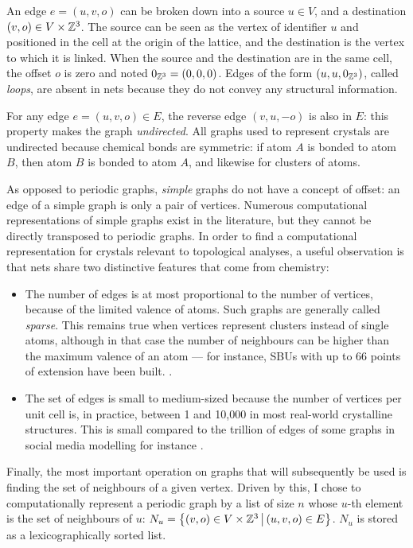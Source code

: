 \documentclass[main.tex]{subfiles}
\begin{document}
An edge $e = (u,v,o)$ can be broken down into a source $u\in V$, and a destination $(v,o)\in V\times\mathbb{Z}^3$. The source can be seen as the vertex of identifier $u$ and positioned in the cell at the origin of the lattice, and the destination is the vertex to which it is linked. When the source and the destination are in the same cell, the offset $o$ is zero and noted $0_{\mathbb{Z}^3} = (0,0,0)$. Edges of the form $(u,u,0_{\mathbb{Z}^3})$, called \emph{loops}, are absent in nets because they do not convey any structural information.

For any edge $e = (u,v,o)\in E$, the reverse edge $(v,u,-o)$ is also in $E$: this property makes the graph \emph{undirected}. All graphs used to represent crystals are undirected because chemical bonds are symmetric: if atom $A$ is bonded to atom $B$, then atom $B$ is bonded to atom $A$, and likewise for clusters of atoms.%

\medskip

As opposed to periodic graphs, \emph{simple} graphs do not have a concept of offset: an edge of a simple graph is only a pair of vertices. Numerous computational representations of simple graphs exist in the literature, but they cannot be directly transposed to periodic graphs. In order to find a computational representation for crystals relevant to topological analyses, a useful observation is that nets share two distinctive features that come from chemistry:
\begin{itemize}[noitemsep]
	\item The number of edges is at most proportional to the number of vertices, because of the limited valence of atoms. Such graphs are generally called \emph{sparse}. This remains true when vertices represent clusters instead of single atoms, although in that case the number of neighbours can be higher than the maximum valence of an atom --- for instance, SBUs with up to 66 points of extension have been built. \autocite{SBUs}.
	\item The set of edges is small to medium-sized because the number of vertices per unit cell is, in practice, between 1 and 10,000 in most real-world crystalline structures. This is small compared to the trillion of edges of some graphs in social media modelling for instance \autocite{facebook}.
\end{itemize}

Finally, the most important operation on graphs that will subsequently be used is finding the set of neighbours of a given vertex. Driven by this, I chose to computationally represent a periodic graph by a list of size $n$ whose $u$-th element is the set of neighbours of $u$: \linebreak$N_u= \left\{(v,o)\in V\times\mathbb{Z}^3\,\middle|\,(u,v,o)\in E\right\}$. $N_u$ is stored as a lexicographically sorted list. %
\end{document}
